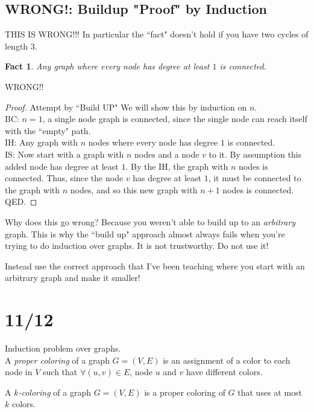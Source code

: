 \documentclass{article}
\newtheorem{fact}{Fact}
\begin{document}
\subsection{WRONG!: Buildup "Proof" by Induction}

THIS IS WRONG!!!  In particular the ``fact" doesn't hold if you have two cycles of length $3$.
\begin{fact}
    Any graph where every node has degree at least $1$ is connected.
\end{fact}

WRONG!!
\begin{proof}
    Attempt by ``Build UP"
    We will show this by induction on $n$.\\
\noindent
    BC: $n = 1$, a single node graph is connected, since the single node can reach itself with the ``empty" path.\\
\noindent
IH: Any graph with $n$ nodes where every node has degree $1$ is connected.\\
\noindent
IS: Now start with a graph with $n$ nodes and a node $v$ to it.  By assumption this added node has degree at least $1$.  By the IH, the graph with $n$ nodes is connected.  Thus, since the node $v$ has degree at least $1$, it must be connected to the graph with $n$ nodes, and so this new graph with $n+1$ nodes is connected.   QED.
\end{proof}

Why does this go wrong?  Because you weren't able to build up to an \emph{arbitrary} graph.  This is why the ``build up" approach almost always fails when you're trying to do induction over graphs.  It is not trustworthy.  Do not use it! 

Instead use the correct approach that I've been teaching where you start with an arbitrary graph and make it smaller!





\section{11/12}
Induction problem over graphs.\\

A \emph{proper coloring} of a graph $G = (V,E)$ is an assignment of a color to each node in $V$ such that $\forall (u,v) \in E$, node $u$ and $v$ have different colors.

A \emph{$k$-coloring} of a graph $G = (V,E)$ is a proper coloring of $G$ that uses at most $k$ colors.
\end{document}
